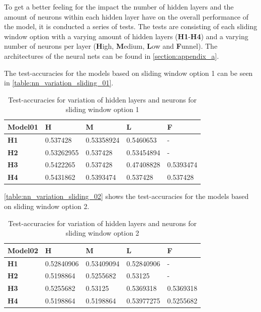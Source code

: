 To get a better feeling for the impact the number of hidden layers and the amount of neurons within each hidden layer have on the overall performance of the model, it is conducted a series of tests.\newline
The tests are consisting of each sliding window option with a varying amount of hidden layers (\textbf{H1}-\textbf{H4}) and a varying number of neurons per layer (\textbf{H}igh, \textbf{M}edium, \textbf{L}ow and \textbf{F}unnel).\newline
The architectures of the neural nets can be found in \autoref{section:appendix_a}.\newline

The test-accuracies for the models based on sliding window option 1 can be seen in \autoref{table:nn_variation_sliding_01}.

\begin{table}
\centering
\begin{tabular}{|l|l|l|l|l|}
\hline

\textbf{Model01} & \textbf{H} & \textbf{M} & \textbf{L} & \textbf{F} \\ \hline
\textbf{H1} & 0.537428 & 0.53358924 & 0.5460653 & - \\ \hline
\textbf{H2} & 0.53262955 & 0.537428 & 0.53454894 & - \\ \hline
\textbf{H3} & 0.5422265 & 0.537428 & 0.47408828 & 0.5393474 \\ \hline
\textbf{H4} & 0.5431862 & 0.5393474 & 0.537428 & 0.537428 \\ \hline

\end{tabular}
\caption{Test-accuracies for variation of hidden layers and neurons for sliding window option 1}
\label{table:nn_variation_sliding_01}
\end{table}

\autoref{table:nn_variation_sliding_02} shows the test-accuracies for the models based on sliding window option 2.

\begin{table}
\centering
\begin{tabular}{|l|l|l|l|l|}
\hline

\textbf{Model02} & \textbf{H} & \textbf{M} & \textbf{L} & \textbf{F} \\ \hline
\textbf{H1} & 0.52840906 & 0.53409094 & 0.52840906 & - \\ \hline
\textbf{H2} & 0.5198864 & 0.5255682 & 0.53125 & - \\ \hline
\textbf{H3} & 0.5255682 & 0.53125 & 0.5369318 & 0.5369318 \\ \hline
\textbf{H4} & 0.5198864 & 0.5198864 & 0.53977275 & 0.5255682 \\ \hline

\end{tabular}
\caption{Test-accuracies for variation of hidden layers and neurons for sliding window option 2}
\label{table:nn_variation_sliding_02}
\end{table}

